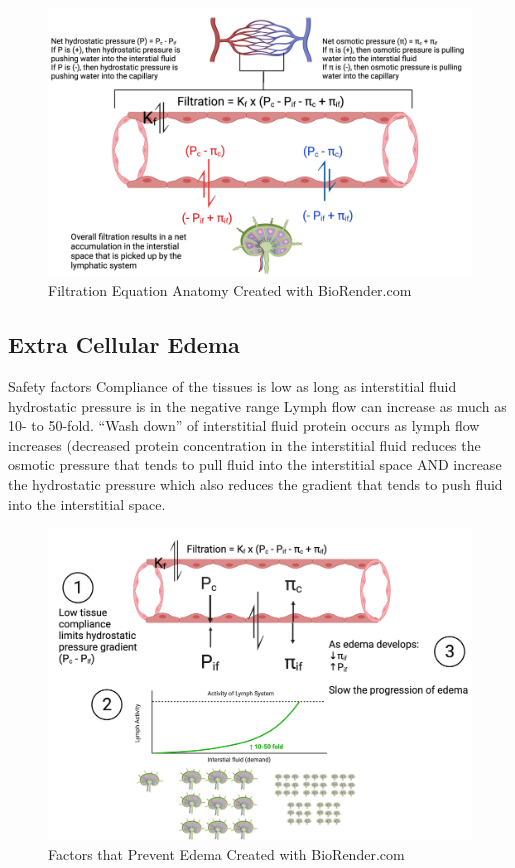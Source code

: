 \subsection{}
\begin{figure}[!h]
    \centering
    \includegraphics[width=1\linewidth]{./figure/Microcirculation_Regulation.png}
    \caption{Filtration Equation Anatomy \footnotesize{Created with BioRender.com}}
    \label{fig:Microcirculation_Regulation}
\end{figure}

\subsection{Extra Cellular Edema}
Safety factors
Compliance of the tissues is low as long as interstitial fluid hydrostatic pressure is in the negative range
﻿Lymph flow can increase as much as 10- to 50-fold.
﻿“Wash down” of interstitial fluid protein occurs as lymph flow increases (decreased protein concentration in the interstitial fluid reduces the osmotic pressure that tends to pull fluid into the interstitial space AND increase the hydrostatic pressure which also reduces the gradient that tends to push fluid into the interstitial space.


\begin{figure}[!h]
    \centering
    \includegraphics[width=1\linewidth]{./figure/Factors_Prevent_Edema.png}
    \caption{Factors that Prevent Edema \footnotesize{Created with BioRender.com}}
    \label{fig:Factors_Prevent_Edema}
\end{figure}

